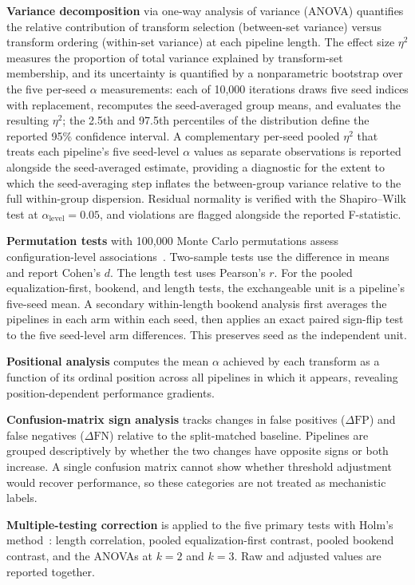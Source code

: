 \documentclass[preprint,review,12pt]{elsarticle}
\begin{document}
\textbf{Variance decomposition} via one-way analysis of variance (ANOVA) quantifies the relative contribution of transform selection (between-set variance) versus transform ordering (within-set variance) at each pipeline length. The effect size $\eta^2$ measures the proportion of total variance explained by transform-set membership, and its uncertainty is quantified by a nonparametric bootstrap over the five per-seed $\alpha$ measurements: each of 10{,}000 iterations draws five seed indices with replacement, recomputes the seed-averaged group means, and evaluates the resulting $\eta^2$; the 2.5th and 97.5th percentiles of the distribution define the reported 95\% confidence interval. A complementary per-seed pooled $\eta^2$ that treats each pipeline's five seed-level $\alpha$ values as separate observations is reported alongside the seed-averaged estimate, providing a diagnostic for the extent to which the seed-averaging step inflates the between-group variance relative to the full within-group dispersion. Residual normality is verified with the Shapiro--Wilk test at $\alpha_{\text{level}} = 0.05$, and violations are flagged alongside the reported F-statistic.

\textbf{Permutation tests} with 100{,}000 Monte Carlo permutations assess configuration-level associations~\cite{Good2005}. Two-sample tests use the difference in means and report Cohen's $d$. The length test uses Pearson's $r$. For the pooled equalization-first, bookend, and length tests, the exchangeable unit is a pipeline's five-seed mean. A secondary within-length bookend analysis first averages the pipelines in each arm within each seed, then applies an exact paired sign-flip test to the five seed-level arm differences. This preserves seed as the independent unit.

\textbf{Positional analysis} computes the mean $\alpha$ achieved by each transform as a function of its ordinal position across all pipelines in which it appears, revealing position-dependent performance gradients.

\textbf{Confusion-matrix sign analysis} tracks changes in false positives ($\Delta\text{FP}$) and false negatives ($\Delta\text{FN}$) relative to the split-matched baseline. Pipelines are grouped descriptively by whether the two changes have opposite signs or both increase. A single confusion matrix cannot show whether threshold adjustment would recover performance, so these categories are not treated as mechanistic labels.

\textbf{Multiple-testing correction} is applied to the five primary tests with Holm's method~\cite{Holm1979}: length correlation, pooled equalization-first contrast, pooled bookend contrast, and the ANOVAs at $k=2$ and $k=3$. Raw and adjusted values are reported together.
\end{document}
